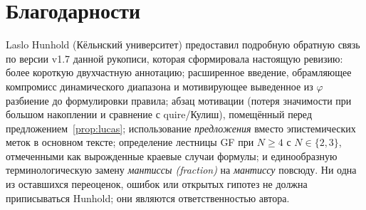 \documentclass[11pt,a4paper]{article}
\theoremstyle{plain}
\begin{document}
\section*{Благодарности}
Laslo Hunhold (Кёльнский университет) предоставил подробную обратную связь по
версии v1.7 данной рукописи, которая сформировала настоящую ревизию: более
короткую двухчастную аннотацию; расширенное введение, обрамляющее компромисс
динамического диапазона и мотивирующее выведенное из \(\varphi\) разбиение до
формулировки правила; абзац мотивации (потеря значимости при большом накоплении
и сравнение с quire/Кулиш), помещённый перед предложением~\ref{prop:lucas};
использование \emph{предложения} вместо эпистемических меток в основном тексте;
определение лестницы GF при \(N \ge 4\) с \(N \in \{2, 3\}\), отмеченными как
вырожденные краевые случаи формулы; и единообразную терминологическую замену
\emph{мантиссы (fraction)} на \emph{мантиссу} повсюду. Ни одна из оставшихся
переоценок, ошибок или открытых гипотез не должна приписываться Hunhold; они
являются ответственностью автора.
\end{document}
